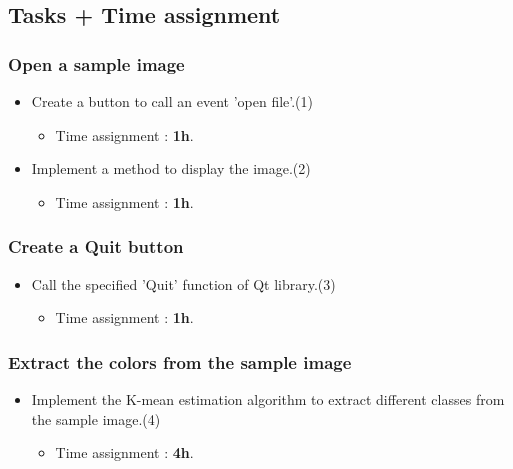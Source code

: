 \documentclass[12pt]{article}
\begin{document}
\subsection{Tasks + Time assignment}
\subsubsection{\textbf{Open a sample image}}
\begin{itemize}
	\item Create a button to call an event 'open file'.(1)
	      \begin{itemize}
	      	\item Time assignment : \textbf{1h}.
	      \end{itemize}
	\item Implement a method to display the image.(2)
	      \begin{itemize}
	      	\item Time assignment : \textbf{1h}.
	      \end{itemize}
\end{itemize}
\medbreak
\subsubsection{\textbf{Create a Quit button}}
\begin{itemize}
	\item Call the specified 'Quit' function of Qt library.(3)
	      \begin{itemize}
	      	\item Time assignment : \textbf{1h}.
	      \end{itemize}
\end{itemize}
\medbreak
\subsubsection{\textbf{Extract the colors from the sample image}}
\begin{itemize}
\item Implement the K-mean estimation algorithm to extract different classes from the sample image.(4)
	      \begin{itemize}
	      	\item Time assignment : \textbf{4h}.
	      \end{itemize}
\end{itemize}
\medbreak
\end{document}
